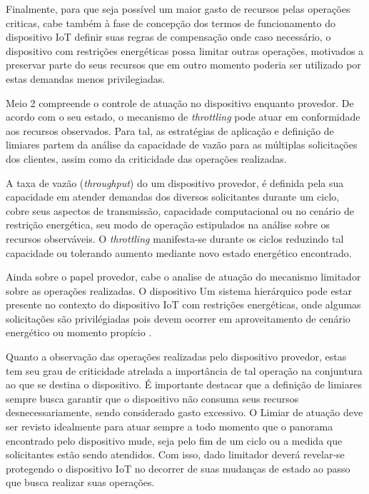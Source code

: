 Finalmente, para que seja possível um maior gasto de recursos pelas operações criticas, cabe também à fase de concepção dos termos de funcionamento do dispositivo \acs{IoT} definir suas regras de compensação onde caso necessário, o dispositivo com restrições energéticas possa limitar outras operações, motivados a preservar parte do seus recursos que em outro momento poderia ser utilizado por estas demandas menos privilegiadas.


Meio 2 compreende o controle de atuação no dispositivo enquanto provedor. De acordo com o seu estado, o mecanismo de \textit{throttling} pode atuar em conformidade aos recursos observados. Para tal, as estratégias de aplicação e definição de limiares partem da análise da capacidade de vazão para as múltiplas solicitações dos clientes, assim como da criticidade das operações realizadas. 

A taxa de vazão (\textit{throughput}) do um dispositivo provedor, é definida pela sua capacidade em atender demandas dos diversos solicitantes durante um ciclo, cobre seus aspectos de transmissão, capacidade computacional ou no cenário de restrição energética, seu modo de operação estipulados na análise sobre os recursos observáveis. O \textit{throttling} manifesta-se durante os ciclos reduzindo tal capacidade ou tolerando aumento mediante novo estado energético encontrado.  

Ainda sobre o papel provedor, cabe o analise de atuação do mecanismo limitador sobre as operações realizadas. O dispositivo  Um sistema hierárquico pode estar presente no contexto do dispositivo \acs{IoT} com restrições energéticas, onde algumas solicitações são privilégiadas pois devem ocorrer em aproveitamento de cenário energético ou momento propício . 

Quanto a observação das operações realizadas pelo dispositivo provedor, estas tem seu grau de criticidade atrelada a importância de tal operação na conjuntura ao que se destina o dispositivo. É importante destacar que a definição de limiares sempre busca garantir que o dispositivo não consuma seus recursos desnecessariamente, sendo considerado gasto excessivo. O Limiar de atuação deve ser revisto idealmente para atuar sempre a todo momento que o panorama encontrado pelo dispositivo mude, seja pelo fim de um ciclo ou a medida que solicitantes estão sendo atendidos. Com isso, dado limitador deverá revelar-se protegendo o dispositivo \acs{IoT} no decorrer de suas mudanças de estado ao passo que busca realizar suas operações. 

